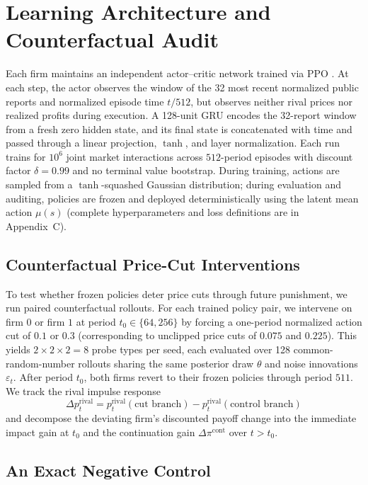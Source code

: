 \section{Learning Architecture and Counterfactual Audit}

Each firm maintains an independent actor--critic network trained via PPO \citep{schulman2017proximal}. At each step, the actor observes the window of the 32 most recent normalized public reports and normalized episode time $t/512$, but observes neither rival prices nor realized profits during execution. A 128-unit GRU encodes the 32-report window from a fresh zero hidden state, and its final state is concatenated with time and passed through a linear projection, $\tanh$, and layer normalization. Each run trains for $10^6$ joint market interactions across $512$-period episodes with discount factor $\delta=0.99$ and no terminal value bootstrap. During training, actions are sampled from a $\tanh$-squashed Gaussian distribution; during evaluation and auditing, policies are frozen and deployed deterministically using the latent mean action $\mu(s)$ (complete hyperparameters and loss definitions are in Appendix~C).

\subsection{Counterfactual Price-Cut Interventions}

To test whether frozen policies deter price cuts through future punishment, we run paired counterfactual rollouts. For each trained policy pair, we intervene on firm $0$ or firm $1$ at period $t_0\in\{64,256\}$ by forcing a one-period normalized action cut of $0.1$ or $0.3$ (corresponding to unclipped price cuts of $0.075$ and $0.225$). This yields $2\times 2\times 2=8$ probe types per seed, each evaluated over 128 common-random-number rollouts sharing the same posterior draw $\theta$ and noise innovations $\varepsilon_t$. After period $t_0$, both firms revert to their frozen policies through period $511$. We track the rival impulse response
\[
\Delta p^{\mathrm{rival}}_t
= p^{\mathrm{rival}}_t(\text{cut branch})
- p^{\mathrm{rival}}_t(\text{control branch})
\]
and decompose the deviating firm's discounted payoff change into the immediate impact gain at $t_0$ and the continuation gain $\Delta\pi^{\mathrm{cont}}$ over $t>t_0$.

\subsection{An Exact Negative Control}


